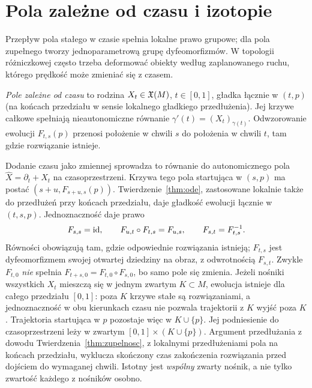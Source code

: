 \section{Pola zależne od czasu i izotopie}
\label{sec:izotopie}

Przepływ pola stałego w czasie spełnia lokalne prawo grupowe;
dla pola zupełnego tworzy jednoparametrową grupę dyfeomorfizmów.
W topologii różniczkowej często trzeba deformować obiekty według
zaplanowanego ruchu, którego prędkość może zmieniać się z czasem.

\begin{definicja}
\emph{Pole zależne od czasu} to rodzina $X_t\in\mathfrak X(M)$,
$t\in[0,1]$, gładka łącznie w $(t,p)$ (na końcach przedziału
w sensie lokalnego gładkiego przedłużenia). Jej krzywe całkowe spełniają nieautonomiczne równanie
$\gamma'(t)=(X_t)_{\gamma(t)}$. Odwzorowanie ewolucji
$F_{t,s}(p)$ przenosi położenie w chwili $s$ do położenia
w chwili $t$, tam gdzie rozwiązanie istnieje.
\end{definicja}

Dodanie czasu jako zmiennej sprowadza to równanie do autonomicznego
pola $\widehat X=\partial_t+X_t$ na czasoprzestrzeni.
Krzywa tego pola startująca w $(s,p)$ ma postać
$(s+u,F_{s+u,s}(p))$. Twierdzenie~\ref{thm:ode}, zastosowane
lokalnie także do przedłużeń przy końcach przedziału, daje
gładkość ewolucji łącznie w $(t,s,p)$. Jednoznaczność daje prawo
\begin{equation}\label{eq:ewolucja}
 F_{s,s}=\mathrm{id},\qquad F_{u,t}\circ F_{t,s}=F_{u,s},
 \qquad F_{s,t}=F_{t,s}^{-1}.
\end{equation}
Równości obowiązują tam, gdzie odpowiednie rozwiązania istnieją;
$F_{t,s}$ jest dyfeomorfizmem swojej otwartej dziedziny na obraz,
z odwrotnością $F_{s,t}$.
Zwykle $F_{t,0}$ \emph{nie} spełnia
$F_{t+s,0}=F_{t,0}\circ F_{s,0}$, bo samo pole się zmienia.
Jeżeli nośniki wszystkich $X_t$ mieszczą się w jednym zwartym
$K\subset M$, ewolucja istnieje dla całego przedziału $[0,1]$:
poza $K$ krzywe stałe są rozwiązaniami, a jednoznaczność
w obu kierunkach czasu nie pozwala trajektorii z $K$ wyjść
poza $K$. Trajektoria startująca w $p$ pozostaje więc w
$K\cup\{p\}$. Jej podniesienie do czasoprzestrzeni leży
w zwartym $[0,1]\times(K\cup\{p\})$. Argument przedłużania
z dowodu Twierdzenia~\ref{thm:zupelnosc}, z lokalnymi przedłużeniami
pola na końcach przedziału, wyklucza skończony czas zakończenia
rozwiązania przed dojściem do wymaganej chwili. Istotny jest
\emph{wspólny} zwarty nośnik, a nie tylko zwartość każdego z nośników osobno.

